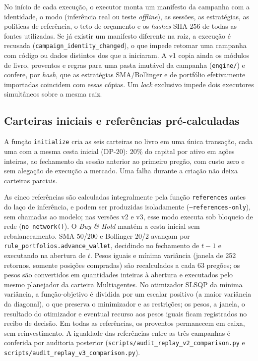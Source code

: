 \documentclass{eic-bcc-tcc}
\begin{document}
No início de cada execução, o executor monta um manifesto da campanha com a identidade, o modo (inferência real ou teste \textit{offline}), as sessões, as estratégias, as políticas de referência, o teto de orçamento e os \textit{hashes} SHA-256 de todas as fontes utilizadas. Se já existir um manifesto diferente na raiz, a execução é recusada (\texttt{campaign\_identity\_changed}), o que impede retomar uma campanha com código ou dados distintos dos que a iniciaram. A v1 copia ainda os módulos de livro, proventos e regras para uma pasta imutável da campanha (\texttt{engine/}) e confere, por \textit{hash}, que as estratégias SMA/Bollinger e de portfólio efetivamente importadas coincidem com essas cópias. Um \textit{lock} exclusivo impede dois executores simultâneos sobre a mesma raiz.

\subsection{Carteiras iniciais e referências pré-calculadas}

A função \texttt{initialize} cria as seis carteiras no livro em uma única transação, cada uma com a mesma cesta inicial (DP-20): 20\% do capital por ativo em ações inteiras, ao fechamento da sessão anterior ao primeiro pregão, com custo zero e sem alegação de execução a mercado. Uma falha durante a criação não deixa carteiras parciais.

As cinco referências são calculadas integralmente pela função \texttt{references} antes do laço de inferência, e podem ser produzidas isoladamente (\texttt{--references-only}), sem chamadas ao modelo; nas versões v2 e v3, esse modo executa sob bloqueio de rede (\texttt{no\_network()}). O \textit{Buy \& Hold} mantém a cesta inicial sem rebalanceamento. SMA 50/200 e Bollinger 20/2 avançam por \texttt{rule\_portfolios.advance\_wallet}, decidindo no fechamento de $t-1$ e executando na abertura de $t$. Pesos iguais e mínima variância (janela de 252 retornos, somente posições compradas) são recalculados a cada 63 pregões; os pesos são convertidos em quantidades inteiras à abertura e executados pelo mesmo planejador da carteira Multiagentes. No otimizador SLSQP da mínima variância, a função-objetivo é dividida por um escalar positivo (a maior variância da diagonal), o que preserva o minimizador e as restrições; os pesos, a janela, o resultado do otimizador e eventual recurso aos pesos iguais ficam registrados no recibo de decisão. Em todas as referências, os proventos permanecem em caixa, sem reinvestimento. A igualdade das referências entre as três campanhas é conferida por auditoria posterior (\texttt{scripts/audit\_replay\_v2\_comparison.py} e \texttt{scripts/audit\_replay\_v3\_comparison.py}).
\end{document}
